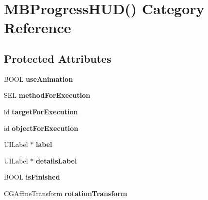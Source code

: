 \hypertarget{category_m_b_progress_h_u_d_07_08}{}\section{M\+B\+Progress\+H\+UD() Category Reference}
\label{category_m_b_progress_h_u_d_07_08}
\subsection*{Protected Attributes}
\begin{DoxyCompactItemize}
\item 
\mbox{\label{category_m_b_progress_h_u_d_07_08_a02d87dc36a3b447307dd9ded05a00125}} 
B\+O\+OL {\bfseries use\+Animation}
\item 
\mbox{\label{category_m_b_progress_h_u_d_07_08_a7456f23346940d6817ba470c51a1744b}} 
S\+EL {\bfseries method\+For\+Execution}
\item 
\mbox{\label{category_m_b_progress_h_u_d_07_08_acc585389227da5b3f544266043387b76}} 
id {\bfseries target\+For\+Execution}
\item 
\mbox{\label{category_m_b_progress_h_u_d_07_08_aa5190868986978809287124475d0af72}} 
id {\bfseries object\+For\+Execution}
\item 
\mbox{\label{category_m_b_progress_h_u_d_07_08_ad67454c02b60533cf97401be15c37286}} 
U\+I\+Label $\ast$ {\bfseries label}
\item 
\mbox{\label{category_m_b_progress_h_u_d_07_08_a4185a66323794638e5baa6da7a668e46}} 
U\+I\+Label $\ast$ {\bfseries details\+Label}
\item 
\mbox{\label{category_m_b_progress_h_u_d_07_08_adf7a5c33432db7d4a20e3737adbe5302}} 
B\+O\+OL {\bfseries is\+Finished}
\item 
\mbox{\label{category_m_b_progress_h_u_d_07_08_a27ab1a02c2774a908925be63209bce15}} 
C\+G\+Affine\+Transform {\bfseries rotation\+Transform}
\end{DoxyCompactItemize}
